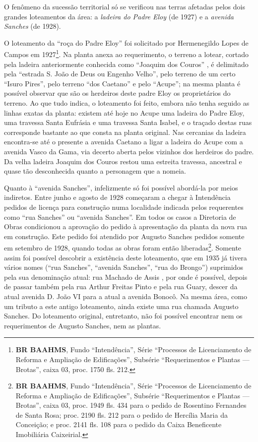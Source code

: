 
O fenômeno da sucessão territorial só se verificou nas terras afetadas pelos dois grandes loteamentos da área: a \textit{ladeira do Padre Eloy} (de 1927) e a \textit{avenida Sanches} (de 1928).

O loteamento da ``roça do Padre Eloy'' foi solicitado por Hermenegildo Lopes de Campos em 1927\footnote{\textbf{BR BAAHMS}, Fundo ``Intendência'', Série ``Processos de Licenciamento de Reforma e Ampliação de Edificações'', Subsérie ``Requerimentos e Plantas --- Brotas'', caixa 03, proc. 1750 fls. 212.}. Na planta anexa ao requerimento, o terreno a lotear, cortado pela ladeira anteriormente conhecida como ``Joaquim dos Couros'' \cite[p.~101]{souza_guia_1935}, é delimitado pela ``estrada S. João de Deus ou Engenho Velho'', pelo terreno de um certo ``Isuro Pires'', pelo terreno ``dos Caetano'' e pelo ``Acupe''; na mesma planta é possível observar que são os herdeiros deste padre Eloy os proprietários do terreno. Ao que tudo indica, o loteamento foi feito, embora não tenha seguido as linhas exatas da planta: existem até hoje no Acupe uma ladeira do Padre Eloy, uma travessa Santa Eufrásia e uma travessa Santa Isabel, e o traçado destas ruas corresponde bastante ao que consta na planta original. Nas cercanias da ladeira encontra-se até o presente a avenida Caetano a ligar a ladeira do Acupe com a avenida Vasco da Gama, via decerto aberta pelos vizinhos dos herdeiros do padre. Da velha ladeira Joaquim dos Couros restou uma estreita travessa, ancestral e quase tão desconhecida quanto a personagem que a nomeia. 

Quanto à ``avenida Sanches'', infelizmente só foi possível abordá-la por meios indiretos. Entre junho e agosto de 1928 começaram a chegar à Intendência pedidos de licença para construção numa localidade indicada pelos requerentes como ``rua Sanches'' ou ``avenida Sanches''. Em todos os casos a Diretoria de Obras condicionou a aprovação do pedido à apresentação da planta da nova rua em construção. Este pedido foi atendido por Augusto Sanches pedidos somente em setembro de 1928, quando todas as obras foram então liberadas\footnote{\textbf{BR BAAHMS}, Fundo ``Intendência'', Série ``Processos de Licenciamento de Reforma e Ampliação de Edificações'', Subsérie ``Requerimentos e Plantas --- Brotas'', caixa 03, proc. 1949 fls. 434 para o pedido de Rosentino Fernandes de Santa Rosa; proc. 2190 fls. 212 para o pedido de Hercília Maria da Conceição; e proc. 2141 fls. 108 para o pedido da Caixa Beneficente Imobiliária Caixeirial.}. Somente assim foi possível descobrir a existência deste loteamento, que em 1935 já tivera vários nomes (``rua Sanches'', ``avenida Sanches'', ``rua do Brongo'') suprimidos pela sua denominação atual: rua Machado de Assis \cite[p.~84]{souza_guia_1935}, por onde é possível, depois de passar também pela rua Arthur Freitas Pinto e pela rua Guary, descer da atual avenida D. João VI para a atual a avenida Bonocô. Na mesma área, como um tributo a este antigo loteamento, ainda existe uma rua chamada Augusto Sanches. Do loteamento original, entretanto, não foi possível encontrar nem os requerimentos de Augusto Sanches, nem as plantas.

